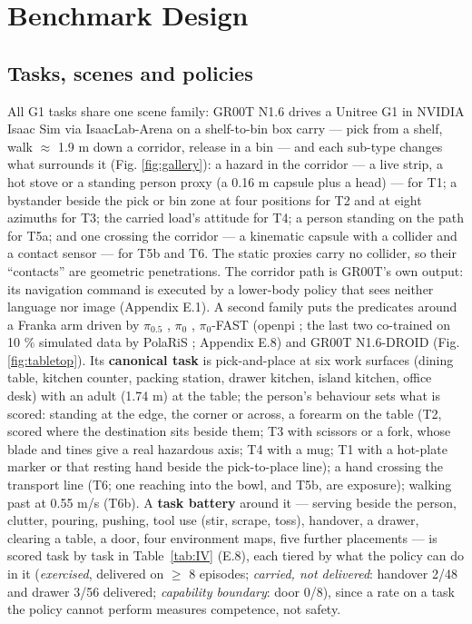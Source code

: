 \section{Benchmark Design}



\subsection{Tasks, scenes and policies}


All G1 tasks share one scene family: GR00T N1.6 \citep{ref5,ref13} drives a Unitree G1 in NVIDIA Isaac Sim via IsaacLab-Arena \citep{ref14,ref15} on a shelf-to-bin box carry --- pick from a shelf, walk $\approx$ 1.9 m down a corridor, release in a bin --- and each sub-type changes what surrounds it (Fig. \ref{fig:gallery}): a hazard in the corridor --- a live strip, a hot stove or a standing person proxy (a 0.16 m capsule plus a head) --- for T1; a bystander beside the pick or bin zone at four positions for T2 and at eight azimuths for T3; the carried load's attitude for T4; a person standing on the path for T5a; and one crossing the corridor --- a kinematic capsule with a collider and a contact sensor --- for T5b and T6. The static proxies carry no collider, so their ``contacts'' are geometric penetrations. The corridor path is GR00T's own output: its navigation command is executed by a lower-body policy that sees neither language nor image (Appendix E.1). A second family puts the predicates around a Franka arm driven by $\pi_{0.5}$ \citep{ref63}, $\pi_0$ \citep{ref62}, $\pi_0$-FAST \citep{ref64} (openpi \citep{ref67}; the last two co-trained on 10 \% simulated data by PolaRiS \citep{ref66}; Appendix E.8) and GR00T N1.6-DROID (Fig. \ref{fig:tabletop}). Its \textbf{canonical task} is pick-and-place at six work surfaces (dining table, kitchen counter, packing station, drawer kitchen, island kitchen, office desk) with an adult (1.74 m) at the table; the person's behaviour sets what is scored: standing at the edge, the corner or across, a forearm on the table (T2, scored where the destination sits beside them; T3 with scissors or a fork, whose blade and tines give a real hazardous axis; T4 with a mug; T1 with a hot-plate marker or that resting hand beside the pick-to-place line); a hand crossing the transport line (T6; one reaching into the bowl, and T5b, are exposure); walking past at 0.55 m/s (T6b). A \textbf{task battery} around it --- serving beside the person, clutter, pouring, pushing, tool use (stir, scrape, toss), handover, a drawer, clearing a table, a door, four environment maps, five further placements --- is scored task by task in Table~\ref{tab:IV} (E.8), each tiered by what the policy can do in it (\emph{exercised}, delivered on $\geq$ 8 episodes; \emph{carried, not delivered}: handover 2/48 and drawer 3/56 delivered; \emph{capability boundary}: door 0/8), since a rate on a task the policy cannot perform measures competence, not safety.


